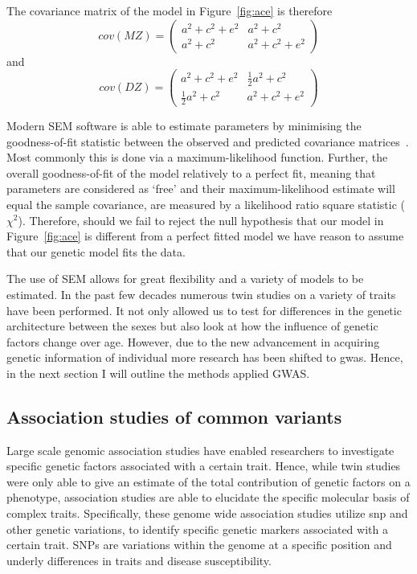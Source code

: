 The covariance matrix of the model in Figure~\ref{fig:ace} is therefore
\begin{equation}
  cov(MZ) = 
  \begin{pmatrix}
    a^2 + c^2 + e^2 & a^2 + c^2 \\
    a^2 + c^2 & a^2 + c^2 + e^2
  \end{pmatrix}
\end{equation}
and 
\begin{equation}
  cov(DZ) = 
  \begin{pmatrix}
    a^2 + c^2 + e^2 & \frac{1}{2}a^2 + c^2 \\
    \frac{1}{2}a^2 + c^2 & a^2 + c^2 + e^2
  \end{pmatrix}
\end{equation}

Modern SEM software is able to estimate parameters by minimising the goodness-of-fit statistic between the observed and predicted covariance matrices~\cite{Boker2011}.
Most commonly this is done via a maximum-likelihood function.
Further, the overall goodness-of-fit of the model relatively to a perfect fit, meaning that parameters are considered as `free' and their maximum-likelihood estimate will equal the sample covariance, are measured by a likelihood ratio square statistic ($\chi^2$).
Therefore, should we fail to reject the null hypothesis that our model in Figure~\ref{fig:ace} is different from a perfect fitted model we have reason to assume that our genetic model fits the data.

The use of SEM allows for great flexibility and a variety of models to be estimated.
In the past few decades numerous twin studies on a variety of traits have been performed.
It not only allowed us to test for differences in the genetic architecture between the sexes but also look at how the influence of genetic factors change over age.
However, due to the new advancement in acquiring genetic information of individual more research has been shifted to \acrfull{gwas}.
Hence, in the next section I will outline the methods applied GWAS\@.

\subsection{Association studies of common variants}
\label{sub:association_studies_of_common_variants}

Large scale genomic association studies have enabled researchers to investigate specific genetic factors associated with a certain trait.
Hence, while twin studies were only able to give an estimate of the total contribution of genetic factors on a phenotype, association studies are able to elucidate the specific molecular basis of complex traits.
Specifically, these genome wide association studies utilize \acrfull{snp} and other genetic variations, to identify specific genetic markers associated with a certain trait.
SNPs are variations within the genome at a specific position and underly differences in traits and disease susceptibility. 

